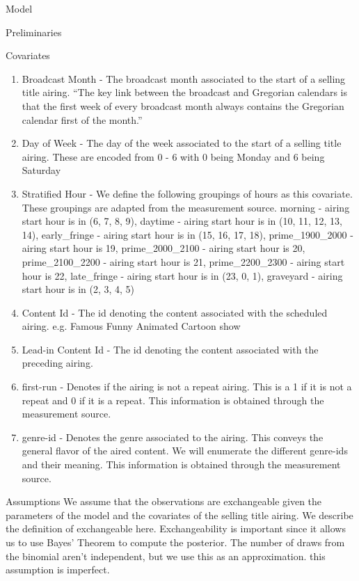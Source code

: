 \begin{chapter}{Model}
\begin{section}{Preliminaries}
\begin{subsection}{Covariates}
  \begin{enumerate}
     \item Broadcast Month - The broadcast month associated to the start of a selling title airing.
       ``The key link between the broadcast and Gregorian calendars is that the first week of every broadcast month always contains the Gregorian calendar first of the month.''
     \item Day of Week - The day of the week associated to the start of a selling title
       airing. These are encoded from 0 - 6 with 0 being Monday and 6 being Saturday
     \item Stratified Hour - We define the following groupings of hours as this covariate.
       These groupings are adapted from the measurement source.
           morning -  airing start hour is in (6, 7, 8, 9),
           daytime - airing start hour is in  (10, 11, 12, 13, 14),
           early\_fringe - airing start hour is in (15, 16, 17, 18),
           prime\_1900\_2000 - airing start hour is 19,
           prime\_2000\_2100 - airing start hour is 20,
           prime\_2100\_2200  - airing start hour is 21,
           prime\_2200\_2300  - airing start hour is 22,
           late\_fringe - airing start hour is in (23, 0, 1),
           graveyard - airing start hour is in (2, 3, 4, 5)
     \item Content Id - The id denoting the content associated with the scheduled airing.
       e.g. Famous Funny Animated Cartoon show
     \item Lead-in Content Id - The id denoting the content associated with the preceding airing.
     \item first-run - Denotes if the airing is not a repeat airing. This is a 1 if it is not a repeat and 0 if it is a repeat.
       This information is obtained through the measurement source.
     \item genre-id - Denotes the genre associated to the airing. This conveys the general flavor of the aired content.
       We will enumerate the different genre-ids and their meaning.
       This information is obtained through the measurement source.
  \end{enumerate}

  \end{subsection}
\end{section}


\begin{section}{Assumptions}
  We assume that the observations are exchangeable given the parameters of the model and the covariates of the selling title airing.
  We describe the definition of exchangeable here. Exchangeability is important since
  it allows us to use Bayes' Theorem to compute the posterior.
  The number of draws from the binomial aren't independent, but we use this as an approximation. this assumption is imperfect.
\end{section}


\end{chapter}
